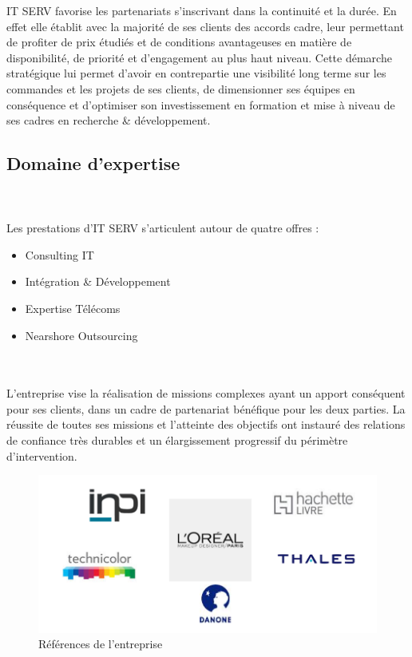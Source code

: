 \begin{spacing}{1.5}
IT SERV favorise les partenariats s'inscrivant dans la continuité et la durée. En effet elle établit avec la majorité de ses clients des accords cadre, leur permettant de profiter de prix étudiés et de conditions avantageuses en matière de disponibilité, de priorité et d'engagement au plus haut niveau. Cette démarche stratégique lui permet d'avoir en contrepartie une visibilité long terme sur les commandes et les projets de ses clients, de dimensionner ses équipes en conséquence et d'optimiser son investissement en formation et mise à niveau de ses cadres en recherche & développement.

\subsection{Domaine d'expertise}
\\\\
Les prestations d'IT SERV s'articulent autour de quatre offres :
\begin{itemize}
    \item Consulting IT
    \item Intégration \& Développement
    \item Expertise Télécoms
    \item Nearshore Outsourcing
\end{itemize}
\\\\
L'entreprise vise la réalisation de missions complexes ayant un apport conséquent pour ses clients, dans un cadre de partenariat bénéfique pour les deux parties. La réussite de toutes ses missions et l'atteinte des objectifs ont instauré des relations de confiance très durables et un élargissement progressif du périmètre d'intervention.

\begin{figure}[!ht]
\centering
\includegraphics[scale=0.8]{reference.png}
\caption{Références de l'entreprise}
\label{refenrences}
\end{figure}


\end{spacing}
